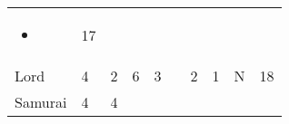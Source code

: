 \documentclass[12pt]{article}
\newcommand{\indexClass}[1]{\index{#1}}
\newcommand{\class}[1]{#1\indexClass{#1}}
\begin{document}
\begin{longtable}[]{@{}llllllllll@{}}
\begin{minipage}[t]{0.07\columnwidth}
\begin{itemize}
\item
\end{itemize}
\strut\end{minipage} &
\begin{minipage}[t]{0.08\columnwidth}\raggedright\strut
17
\strut\end{minipage}\tabularnewline
\begin{minipage}[t]{0.13\columnwidth}\raggedright\strut
\class{Lord}
\strut\end{minipage} &
\begin{minipage}[t]{0.06\columnwidth}\raggedright\strut
4
\strut\end{minipage} &
\begin{minipage}[t]{0.06\columnwidth}\raggedright\strut
2
\strut\end{minipage} &
\begin{minipage}[t]{0.06\columnwidth}\raggedright\strut
6
\strut\end{minipage} &
\begin{minipage}[t]{0.06\columnwidth}\raggedright\strut
3
\strut\end{minipage} &
\begin{minipage}[t]{0.06\columnwidth}\raggedright\strut
\strut\end{minipage} &
\begin{minipage}[t]{0.06\columnwidth}\raggedright\strut
2
\strut\end{minipage} &
\begin{minipage}[t]{0.06\columnwidth}\raggedright\strut
1
\strut\end{minipage} &
\begin{minipage}[t]{0.07\columnwidth}\raggedright\strut
N
\strut\end{minipage} &
\begin{minipage}[t]{0.08\columnwidth}\raggedright\strut
18
\strut\end{minipage}\tabularnewline
\begin{minipage}[t]{0.13\columnwidth}\raggedright\strut
\class{Samurai}
\strut\end{minipage} &
\begin{minipage}[t]{0.06\columnwidth}\raggedright\strut
4
\strut\end{minipage} &
\begin{minipage}[t]{0.06\columnwidth}\raggedright\strut
4
\strut\end{minipage} &
\begin{minipage}[t]{0.06\columnwidth}\raggedright\strut
\strut\end{minipage} &

\end{longtable}
\end{document}
